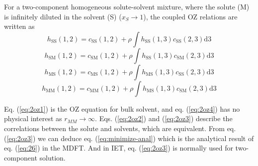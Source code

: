For a two-component homogeneous solute-solvent mixture, where the
solute (M) is infinitely diluted in the solvent (S) ($x_{S}\rightarrow1$),
the coupled \acs{OZ} relations are written as
\begin{equation}
h_{\mathrm{SS}}(1,2)=c_{\mathrm{SS}}(1,2)+\rho\int h_{\mathrm{SS}}(1,3)c_{\mathrm{SS}}(2,3)\mathrm{d}3\label{eq:2oz1}
\end{equation}
\begin{equation}
h_{\mathrm{SM}}(1,2)=c_{\mathrm{SM}}(1,2)+\rho\int h_{\mathrm{SS}}(1,3)c_{\mathrm{SM}}(2,3)\mathrm{d}3\label{eq:2oz2}
\end{equation}
\begin{equation}
h_{\mathrm{MS}}(1,2)=c_{\mathrm{MS}}(1,2)+\rho\int h_{\mathrm{MS}}(1,3)c_{\mathrm{SS}}(2,3)\mathrm{d}3\label{eq:2oz3}
\end{equation}
\begin{equation}
h_{\mathrm{MM}}(1,2)=c_{\mathrm{MM}}(1,2)+\rho\int h_{\mathrm{MS}}(1,3)c_{\mathrm{SM}}(2,3)\mathrm{d}3\label{eq:2oz4}
\end{equation}

Eq. (\ref{eq:2oz1}) is the \acs{OZ} equation for bulk solvent, and
eq. (\ref{eq:2oz4}) has no physical interest as $r_{MM}\rightarrow\infty$.
Eqs. (\ref{eq:2oz2}) and (\ref{eq:2oz3}) describe the correlations
between the solute and solvents, which are equivalent. From eq. (\ref{eq:2oz3})
we can deduce eq. (\ref{eq:minimize-anal}) which is the analytical
result of eq. (\ref{eq:26}) in the \acs{MDFT}. And in \acs{IET},
eq. (\ref{eq:2oz3}) is normally used for two-component solution.
